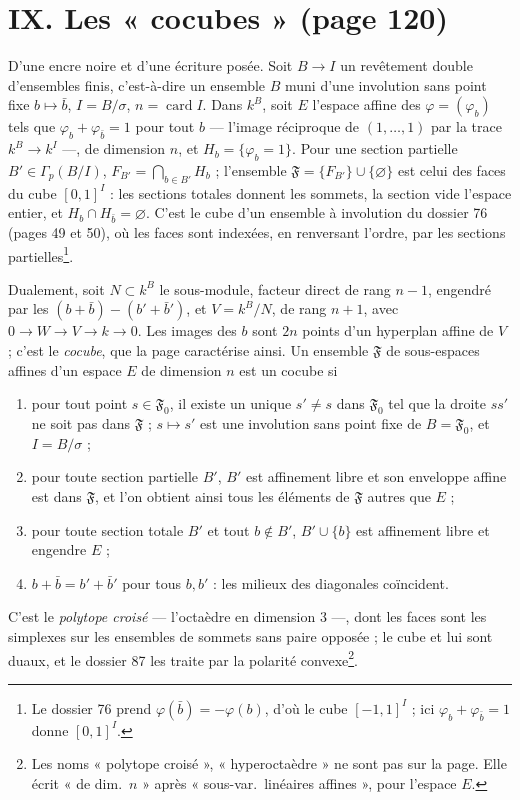 \documentclass[11pt,a4paper]{article}
\begin{document}
\section*{IX. Les « cocubes » (page 120)}

D'une encre noire et d'une écriture posée. Soit $B \to I$ un revêtement double
d'ensembles finis, c'est-à-dire un ensemble $B$ muni d'une involution sans point
fixe $b \mapsto \bar b$, $I = B/\sigma$, $n = \operatorname{card} I$. Dans $k^B$,
soit $E$ l'espace affine des $\varphi = (\varphi_b)$ tels que $\varphi_b +
\varphi_{\bar b} = 1$ pour tout $b$ --- l'image réciproque de $(1, \dots, 1)$
par la trace $k^B \to k^I$ ---, de dimension $n$, et $H_b = \{\varphi_b = 1\}$.
Pour une section partielle $B' \in \Gamma_p(B/I)$, $F_{B'} = \bigcap_{b \in B'}
H_b$ ; l'ensemble $\mathfrak{F} = \{F_{B'}\} \cup \{\varnothing\}$ est celui des
faces du cube $[0, 1]^I$ : les sections totales donnent les sommets, la section
vide l'espace entier, et $H_b \cap H_{\bar b} = \varnothing$. C'est le cube
d'un ensemble à involution du dossier 76 (pages 49 et 50), où les faces sont
indexées, en renversant l'ordre, par les sections partielles\footnote{Le
dossier 76 prend $\varphi(\bar b) = -\varphi(b)$, d'où le cube $[-1, 1]^I$ ; ici
$\varphi_b + \varphi_{\bar b} = 1$ donne $[0, 1]^I$.}.

Dualement, soit $N \subset k^B$ le sous-module, facteur direct de rang $n - 1$,
engendré par les $(b + \bar b) - (b' + \bar b')$, et $V = k^B / N$, de rang $n +
1$, avec $0 \to W \to V \to k \to 0$. Les images des $b$ sont $2n$ points d'un
hyperplan affine de $V$ ; c'est le \emph{cocube}, que la page caractérise ainsi.
Un ensemble $\mathfrak{F}$ de sous-espaces affines d'un espace $E$ de dimension
$n$ est un cocube si
\begin{enumerate}
  \item[a)] pour tout point $s \in \mathfrak{F}_0$, il existe un unique $s' \neq
    s$ dans $\mathfrak{F}_0$ tel que la droite $ss'$ ne soit pas dans
    $\mathfrak{F}$ ; $s \mapsto s'$ est une involution sans point fixe de $B =
    \mathfrak{F}_0$, et $I = B/\sigma$ ;
  \item[b)] pour toute section partielle $B'$, $B'$ est affinement libre et son
    enveloppe affine est dans $\mathfrak{F}$, et l'on obtient ainsi tous les
    éléments de $\mathfrak{F}$ autres que $E$ ;
  \item[c)] pour toute section totale $B'$ et tout $b \notin B'$, $B' \cup
    \{b\}$ est affinement libre et engendre $E$ ;
  \item[d)] $b + \bar b = b' + \bar b'$ pour tous $b, b'$ : les milieux des
    diagonales coïncident.
\end{enumerate}
C'est le \emph{polytope croisé} --- l'octaèdre en dimension $3$ ---, dont les
faces sont les simplexes sur les ensembles de sommets sans paire opposée ; le
cube et lui sont duaux, et le dossier 87 les traite par la polarité
convexe\footnote{Les noms « polytope croisé », « hyperoctaèdre » ne sont pas sur
la page. Elle écrit « de dim.\ $n$ » après « sous-var.\ linéaires affines »,
pour l'espace $E$.}.
\end{document}
